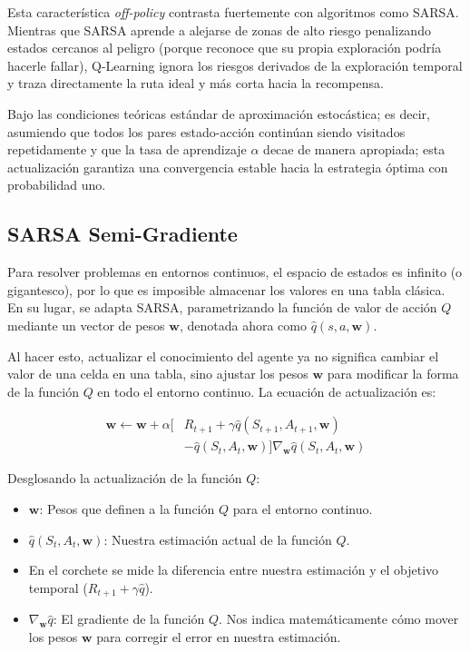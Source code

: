 Esta característica \textit{off-policy} contrasta fuertemente con algoritmos como SARSA. Mientras que SARSA aprende a alejarse de zonas de alto riesgo penalizando estados cercanos al peligro (porque reconoce que su propia exploración podría hacerle fallar), Q-Learning ignora los riesgos derivados de la exploración temporal y traza directamente la ruta ideal y más corta hacia la recompensa. 

Bajo las condiciones teóricas estándar de aproximación estocástica; es decir, asumiendo que todos los pares estado-acción continúan siendo visitados repetidamente y que la tasa de aprendizaje $\alpha$ decae de manera apropiada; esta actualización garantiza una convergencia estable hacia la estrategia óptima con probabilidad uno.

\subsection{SARSA Semi-Gradiente}
Para resolver problemas en entornos continuos, el espacio de estados es infinito (o gigantesco), por lo que es imposible almacenar los valores en una tabla clásica. En su lugar, se adapta SARSA, parametrizando la función de valor de acción $Q$ mediante un vector de pesos $\mathbf{w}$, denotada ahora como $\hat{q}(s, a, \mathbf{w})$. 

Al hacer esto, actualizar el conocimiento del agente ya no significa cambiar el valor de una celda en una tabla, sino ajustar los pesos $\mathbf{w}$ para modificar la forma de la función $Q$ en todo el entorno continuo. La ecuación de actualización es:

\begin{equation*}
\label{eq:sarsa_semigrad}
\begin{split}
\mathbf{w} \leftarrow \mathbf{w} + \alpha \Big[ & R_{t+1} + \gamma \hat{q}(S_{t+1}, A_{t+1}, \mathbf{w}) \\
& - \hat{q}(S_t, A_t, \mathbf{w}) \Big] \nabla_{\mathbf{w}} \hat{q}(S_t, A_t, \mathbf{w})
\end{split}
\end{equation*}

Desglosando la actualización de la función $Q$:

\begin{itemize}
    \item $\mathbf{w}$: Pesos que definen a la función $Q$ para el entorno continuo.
    \item $\hat{q}(S_t, A_t, \mathbf{w})$: Nuestra estimación actual de la función $Q$.
    \item En el corchete se mide la diferencia entre nuestra estimación y el objetivo temporal ($R_{t+1} + \gamma \hat{q}$).
    \item $\nabla_{\mathbf{w}} \hat{q}$: El gradiente de la función $Q$. Nos indica matemáticamente cómo mover los pesos $\mathbf{w}$ para corregir el error en nuestra estimación.
\end{itemize}

